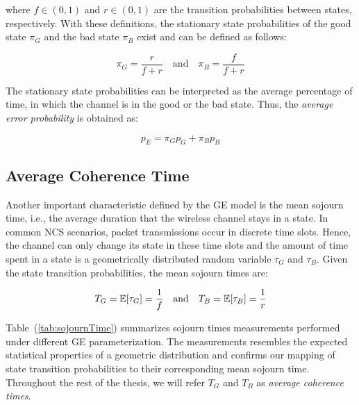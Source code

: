 where $f\in(0,1)$ and $r\in(0,1)$ are the transition probabilities between
states, respectively. With these definitions, the stationary state probabilities
of the good state $\pi_G$ and the bad state $\pi_B$ exist and can be defined as
follows:

\begin{equation}
  \pi_G = \frac{r}{f+r} \quad \textrm{and} \quad \pi_B = \frac{f}{f+r}
\end{equation}

The stationary state probabilities can be interpreted as the average percentage
of time, in which the channel is in the good or the bad state. Thus, the
\textit{average error probability} is obtained as:

\begin{equation}
  p_E = \pi_G p_G + \pi_B p_B
  \label{eq:avgLoss}
\end{equation}

\subsection*{Average Coherence Time}
Another important characteristic defined by the GE model is the mean sojourn
time, i.e., the average duration that the wireless channel stays in a state. In
common NCS scenarios, packet transmissions occur in discrete time slots. Hence,
the channel can only change its state in these time slots and the amount of time
spent in a state is a geometrically distributed random variable $\tau_G$ and
$\tau_B$. Given the state transition probabilities, the mean sojourn times are:

\begin{equation}
  T_G = \mathbb{E}[\tau_G] = \frac{1}{f} \quad \textrm{and} \quad T_B = \mathbb{E}[\tau_B] = \frac{1}{r}
\end{equation}

Table~(\ref{tab:sojournTime}) summarizes sojourn times measurements performed
under different GE parameterization. The measurements resembles the expected
statistical properties of a geometric distribution and confirms our mapping of
state transition probabilities to their corresponding mean sojourn time.
Throughout the rest of the thesis, we will refer $T_G$ and $T_B$ as
\textit{average coherence times}.

